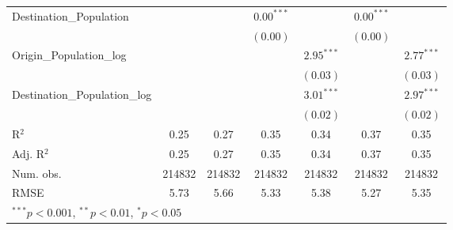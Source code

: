 \begin{table}
\begin{center}
\begin{tabular}{l c c c c c c }
			Destination\_Population      &               &               & $0.00^{***}$  &                & $0.00^{***}$  &                \\
			&               &               & $(0.00)$      &                & $(0.00)$      &                \\
			Origin\_Population\_log      &               &               &               & $2.95^{***}$   &               & $2.77^{***}$   \\
			&               &               &               & $(0.03)$       &               & $(0.03)$       \\
			Destination\_Population\_log &               &               &               & $3.01^{***}$   &               & $2.97^{***}$   \\
			&               &               &               & $(0.02)$       &               & $(0.02)$       \\
			\hline
			R$^2$                        & 0.25          & 0.27          & 0.35          & 0.34           & 0.37          & 0.35           \\
			Adj. R$^2$                   & 0.25          & 0.27          & 0.35          & 0.34           & 0.37          & 0.35           \\
			Num. obs.                    & 214832        & 214832        & 214832        & 214832         & 214832        & 214832         \\
			RMSE                         & 5.73          & 5.66          & 5.33          & 5.38           & 5.27          & 5.35           \\
			\hline
			\multicolumn{7}{l}{\scriptsize{$^{***}p<0.001$, $^{**}p<0.01$, $^*p<0.05$}}
		\end{tabular}
		
		\label{table:coefficients2018Q1}
	\end{center}
\end{table}


